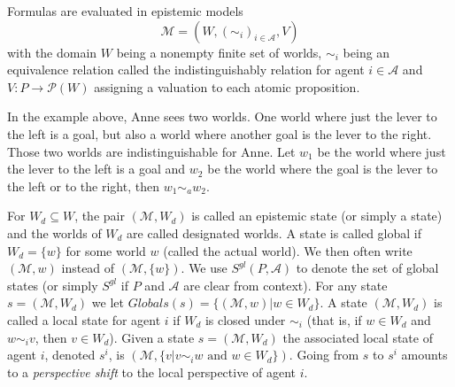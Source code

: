 Formulas are evaluated in epistemic models 
$$
\mathcal{M}=(W, (\sim_i)_{i \in \mathcal{A}}, V)
$$
with the domain $W$ being a nonempty finite set of worlds,
$\sim_i$ being an equivalence relation called the indistinguishably relation for agent $i \in \mathcal{A}$ and $V : P \rightarrow \mathcal{P}(W)$ assigning a valuation to each atomic proposition.

In the example above, Anne sees two worlds. One world where just the lever to the left is a goal, but also a world where another goal is the lever to the right. Those two worlds are indistinguishable for Anne. Let $w_1$ be the world where just the lever to the left is a goal and $w_2$ be the world where the goal is the lever to the left or to the right, then $w_1 \sim_a w_2$.


For $W_d \subseteq W$, the pair $(\mathcal{M}, W_d)$ is called an epistemic state (or simply a state) and the worlds of $W_d$ are called designated worlds. A state is called global if $W_d=\{w\}$ for some world $w$ (called the actual world). We then often write $(\mathcal{M},w)$ instead of $(\mathcal{M},\{w\} )$. We use $S^{gl}(P,\mathcal{A})$ to denote the set of global states (or simply $S^{gl}$ if $P$ and $\mathcal{A}$ are clear from context). For any state $ s=(\mathcal{M}, W_d) $ we let $Globals(s)= \{ (\mathcal{M},w) | w \in W_d \} $.
A state $(\mathcal{M}, W_d)$ is called a local state for agent $i$ if $W_d$ is closed under $\sim _i$ (that is, if $w \in W_d$ and $w \sim _i v $, then $v \in W_d$).
Given a state $s=(\mathcal{M}, W_d)$ the associated local state of agent $i$, denoted $s^i$, is $(\mathcal{M},\{v|v\sim _i w \text{ and } w \in W_d\})$. Going from $s$ to $s^i$ amounts to a \textit{perspective shift} to the local perspective of agent $i$.

